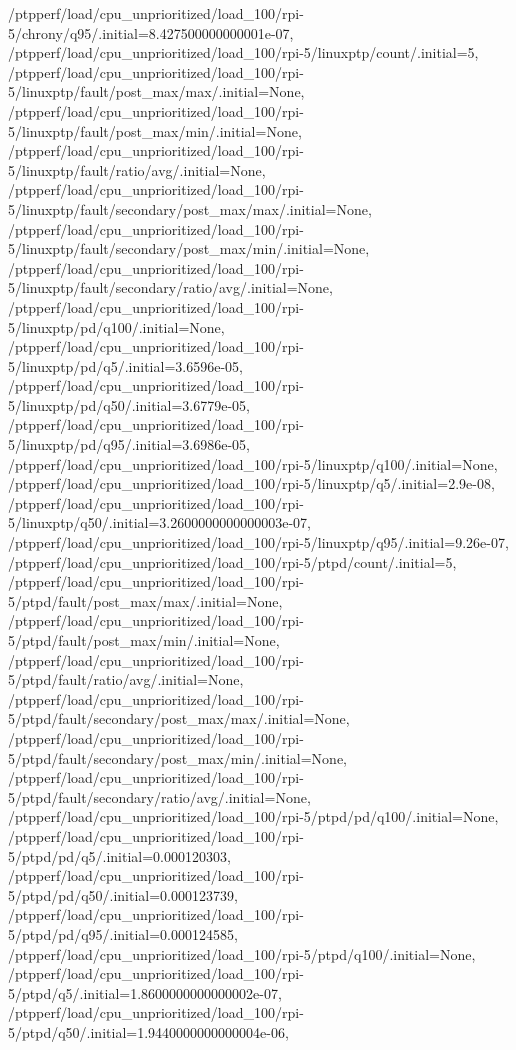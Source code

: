 {    /ptpperf/load/cpu_unprioritized/load_100/rpi-5/chrony/q95/.initial=8.427500000000001e-07,
    /ptpperf/load/cpu_unprioritized/load_100/rpi-5/linuxptp/count/.initial=5,
    /ptpperf/load/cpu_unprioritized/load_100/rpi-5/linuxptp/fault/post_max/max/.initial=None,
    /ptpperf/load/cpu_unprioritized/load_100/rpi-5/linuxptp/fault/post_max/min/.initial=None,
    /ptpperf/load/cpu_unprioritized/load_100/rpi-5/linuxptp/fault/ratio/avg/.initial=None,
    /ptpperf/load/cpu_unprioritized/load_100/rpi-5/linuxptp/fault/secondary/post_max/max/.initial=None,
    /ptpperf/load/cpu_unprioritized/load_100/rpi-5/linuxptp/fault/secondary/post_max/min/.initial=None,
    /ptpperf/load/cpu_unprioritized/load_100/rpi-5/linuxptp/fault/secondary/ratio/avg/.initial=None,
    /ptpperf/load/cpu_unprioritized/load_100/rpi-5/linuxptp/pd/q100/.initial=None,
    /ptpperf/load/cpu_unprioritized/load_100/rpi-5/linuxptp/pd/q5/.initial=3.6596e-05,
    /ptpperf/load/cpu_unprioritized/load_100/rpi-5/linuxptp/pd/q50/.initial=3.6779e-05,
    /ptpperf/load/cpu_unprioritized/load_100/rpi-5/linuxptp/pd/q95/.initial=3.6986e-05,
    /ptpperf/load/cpu_unprioritized/load_100/rpi-5/linuxptp/q100/.initial=None,
    /ptpperf/load/cpu_unprioritized/load_100/rpi-5/linuxptp/q5/.initial=2.9e-08,
    /ptpperf/load/cpu_unprioritized/load_100/rpi-5/linuxptp/q50/.initial=3.2600000000000003e-07,
    /ptpperf/load/cpu_unprioritized/load_100/rpi-5/linuxptp/q95/.initial=9.26e-07,
    /ptpperf/load/cpu_unprioritized/load_100/rpi-5/ptpd/count/.initial=5,
    /ptpperf/load/cpu_unprioritized/load_100/rpi-5/ptpd/fault/post_max/max/.initial=None,
    /ptpperf/load/cpu_unprioritized/load_100/rpi-5/ptpd/fault/post_max/min/.initial=None,
    /ptpperf/load/cpu_unprioritized/load_100/rpi-5/ptpd/fault/ratio/avg/.initial=None,
    /ptpperf/load/cpu_unprioritized/load_100/rpi-5/ptpd/fault/secondary/post_max/max/.initial=None,
    /ptpperf/load/cpu_unprioritized/load_100/rpi-5/ptpd/fault/secondary/post_max/min/.initial=None,
    /ptpperf/load/cpu_unprioritized/load_100/rpi-5/ptpd/fault/secondary/ratio/avg/.initial=None,
    /ptpperf/load/cpu_unprioritized/load_100/rpi-5/ptpd/pd/q100/.initial=None,
    /ptpperf/load/cpu_unprioritized/load_100/rpi-5/ptpd/pd/q5/.initial=0.000120303,
    /ptpperf/load/cpu_unprioritized/load_100/rpi-5/ptpd/pd/q50/.initial=0.000123739,
    /ptpperf/load/cpu_unprioritized/load_100/rpi-5/ptpd/pd/q95/.initial=0.000124585,
    /ptpperf/load/cpu_unprioritized/load_100/rpi-5/ptpd/q100/.initial=None,
    /ptpperf/load/cpu_unprioritized/load_100/rpi-5/ptpd/q5/.initial=1.8600000000000002e-07,
    /ptpperf/load/cpu_unprioritized/load_100/rpi-5/ptpd/q50/.initial=1.9440000000000004e-06,
}
